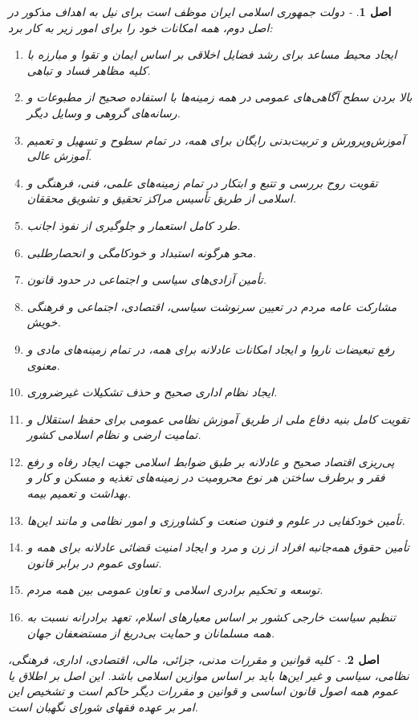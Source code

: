 \documentclass[12pt]{article}
\newtheorem{asl}{اصل}
\begin{document}
\begin{asl}- 
	دولت جمهوری اسلامی ایران موظف است برای نیل به اهداف مذکور در اصل دوم‌، همه امکانات خود را برای امور زیر به کار برد:
		\begin{enumerate}	
		\item
	ایجاد محیط مساعد برای رشد فضایل اخلاقی بر اساس ایمان و تقوا و مبارزه با کلیه مظاهر فساد و تباهی‌.
		\item
	بالا بردن سطح آگاهی‌های عمومی در همه زمینه‌ها با استفاده‌ صحیح از مطبوعات و رسانه‌های گروهی و وسایل دیگر.
		\item
	آموزش‌وپرورش و تربیت‌بدنی رایگان برای همه‌، در تمام سطوح و تسهیل و تعمیم آموزش عالی‌.
		\item
	تقویت روح بررسی و تتبع و ابتکار در تمام زمینه‌های علمی‌، فنی‌، فرهنگی و اسلامی از طریق تأسیس مراکز تحقیق و تشویق ‌محققان‌.
		\item
	طرد کامل استعمار و جلوگیری از نفوذ اجانب‌.
		\item
	محو هرگونه استبداد و خودکامگی و انحصارطلبی‌.
		\item
	تأمین آزادی‌های سیاسی و اجتماعی در حدود قانون‌.
		\item
	مشارکت عامه مردم در تعیین سرنوشت سیاسی‌، اقتصادی‌، اجتماعی و فرهنگی خویش‌.
		\item
	رفع تبعیضات ناروا و ایجاد امکانات عادلانه برای همه‌، در تمام‌ زمینه‌های مادی و معنوی‌.
		\item
	ایجاد نظام اداری صحیح و حذف تشکیلات غیرضروری.
		\item
	تقویت کامل بنیه دفاع ملی از طریق آموزش نظامی عمومی برای حفظ استقلال و تمامیت ارضی و نظام اسلامی کشور.
		\item
	پی‌ریزی اقتصاد صحیح و عادلانه بر طبق ضوابط اسلامی‌ جهت ایجاد رفاه و رفع فقر و برطرف ساختن هر نوع محرومیت در زمینه‌های تغذیه و مسکن و کار و بهداشت و تعمیم بیمه‌.
		\item
	تأمین خودکفایی در علوم و فنون صنعت و کشاورزی و امور نظامی و مانند این‌ها.
		\item
	تأمین حقوق همه‌جانبه افراد از زن و مرد و ایجاد امنیت قضائی عادلانه برای همه و تساوی عموم در برابر قانون‌.
		\item
	توسعه و تحکیم برادری اسلامی و تعاون عمومی بین همه مردم.
		\item
	تنظیم سیاست خارجی کشور بر اساس معیارهای اسلام‌، تعهد برادرانه نسبت به همه مسلمانان و حمایت بی‌دریغ از مستضعفان‌ جهان‌.
		\end{enumerate}	
\end{asl}

\begin{asl}- 
کلیه قوانین و مقررات مدنی‌، جزائی‌، مالی‌، اقتصادی‌، اداری‌، فرهنگی‌، نظامی‌، سیاسی و غیر این‌ها باید بر اساس موازین اسلامی باشد. این اصل بر اطلاق یا عموم همه اصول قانون اساسی ‌و قوانین و مقررات دیگر حاکم است و تشخیص این امر بر عهده ‌فقهای شورای نگهبان است‌.
\end{asl}
\end{document}
